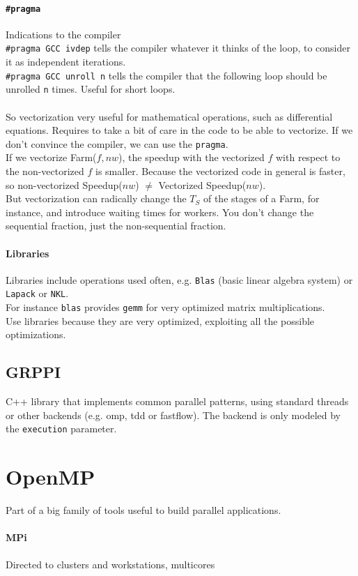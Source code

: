 \documentclass[10pt]{report}
\begin{document}
\paragraph{\texttt{\#pragma}} Indications to the compiler\\
\texttt{\#pragma GCC ivdep} tells the compiler whatever it thinks of the loop, to consider it as independent iterations.\\
\texttt{\#pragma GCC unroll n} tells the compiler that the following loop should be unrolled \texttt{n} times. Useful for short loops.\\\\
So vectorization very useful for mathematical operations, such as differential equations. Requires to take a bit of care in the code to be able to vectorize. If we don't convince the compiler, we can use the \texttt{pragma}.\\
If we vectorize Farm($f,nw$), the speedup with the vectorized $f$ with respect to the non-vectorized $f$ is smaller. Because the vectorized code in general is faster, so non-vectorized Speedup($nw$) $\neq$ Vectorized Speedup($nw$).\\
But vectorization can radically change the $T_S$ of the stages of a Farm, for instance, and introduce waiting times for workers. You don't change the sequential fraction, just the non-sequential fraction.
\paragraph{Libraries} Libraries include operations used often, e.g. \texttt{Blas} (basic linear algebra system) or \texttt{Lapack} or \texttt{NKL}.\\
For instance \texttt{blas} provides \texttt{gemm} for very optimized matrix multiplications.\\
Use libraries because they are very optimized, exploiting all the possible optimizations.
\subsection{GRPPI} C++ library that implements common parallel patterns, using standard threads or other backends (e.g. omp, tdd or fastflow). The backend is only modeled by the \texttt{execution} parameter.
\section{OpenMP}
Part of a big family of tools useful to build parallel applications.
\paragraph{MPi} Directed to clusters and workstations, multicores
\end{document}
